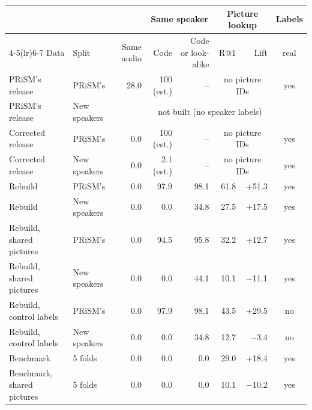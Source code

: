 \begin{tabular}{@{}llrrrrrc@{}}
\toprule
 & & & \multicolumn{2}{c}{Same speaker} & \multicolumn{2}{c}{Picture lookup} & Labels \\
\cmidrule(lr){4-5}\cmidrule(lr){6-7}
Data & Split & Same audio & Code & Code or look-alike & R@1 & Lift & real \\
\midrule
PRiSM's release & PRiSM's & 28.0 & 100 (est.) & -- & \multicolumn{2}{c}{no picture IDs} & yes \\
PRiSM's release & New speakers & \multicolumn{6}{c}{not built (no speaker labels)} \\
\midrule
Corrected release & PRiSM's & 0.0 & 100 (est.) & -- & \multicolumn{2}{c}{no picture IDs} & yes \\
Corrected release & New speakers & 0.0 & 2.1 (est.) & -- & \multicolumn{2}{c}{no picture IDs} & yes \\
\midrule
Rebuild & PRiSM's & 0.0 & 97.9 & 98.1 & 61.8 & +51.3 & yes \\
Rebuild & New speakers & 0.0 & 0.0 & 34.8 & 27.5 & +17.5 & yes \\
Rebuild, shared pictures & PRiSM's & 0.0 & 94.5 & 95.8 & 32.2 & +12.7 & yes \\
Rebuild, shared pictures & New speakers & 0.0 & 0.0 & 44.1 & 10.1 & $-$11.1 & yes \\
Rebuild, control labels & PRiSM's & 0.0 & 97.9 & 98.1 & 43.5 & +29.5 & no \\
Rebuild, control labels & New speakers & 0.0 & 0.0 & 34.8 & 12.7 & $-$3.4 & no \\
\midrule
Benchmark & 5 folds & 0.0 & 0.0 & 0.0 & 29.0 & +18.4 & yes \\
Benchmark, shared pictures & 5 folds & 0.0 & 0.0 & 0.0 & 10.1 & $-$10.2 & yes \\
\bottomrule
\end{tabular}
